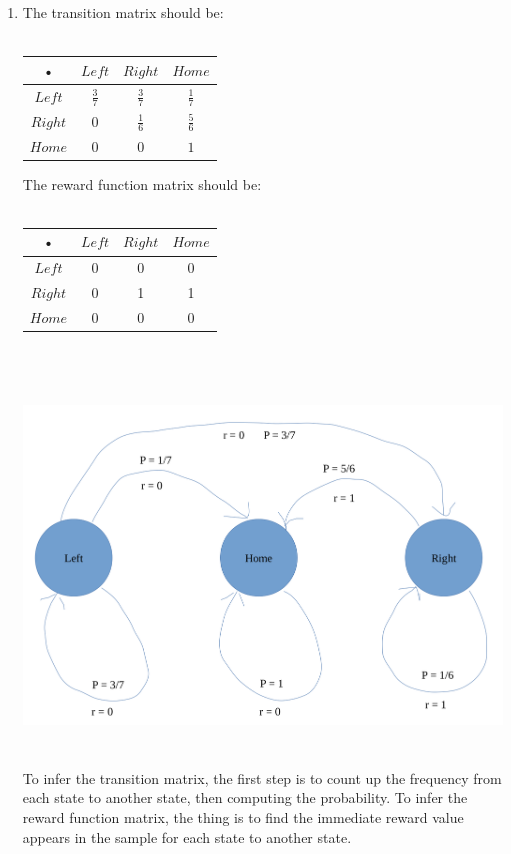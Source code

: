\documentclass[12pt]{article}
\begin{document}
\begin{enumerate}
\begin{enumerate}
\item The transition matrix should be:\\\\
\begin{tabular}{|c|c|c|c|}
\hline 
• & $Left$ & $Right$ & $Home$ \\ 
\hline 
$Left$ & $\frac{3}{7}$ & $\frac{3}{7}$ & $\frac{1}{7}$ \\ 
\hline 
$Right$ & $0$ & $\frac{1}{6}$ & $\frac{5}{6}$ \\ 
\hline 
$Home$ & 0 & 0 & $1$ \\ 
\hline 
\end{tabular}
\newpage
The reward function matrix should be:\\\\
\begin{tabular}{|c|c|c|c|}
\hline 
• & $Left$ & $Right$ & $Home$ \\ 
\hline 
$Left$ & 0 & 0 & 0 \\ 
\hline 
$Right$ & 0 & 1 & 1 \\ 
\hline 
$Home$ & 0 & 0 & 0 \\ 
\hline 
\end{tabular}\\\\\\
\includegraphics[scale=0.3]{q_2}\\\\\\
To infer the transition matrix, the first step is to count up the frequency from each state to another state, then computing the probability. To infer the reward function matrix, the thing is to find the immediate reward value appears in the sample for each state to another state.


\end{enumerate}
\end{enumerate}
\end{document}
